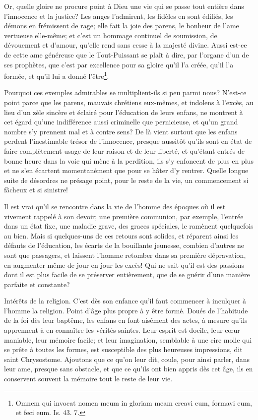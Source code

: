 \documentclass[instructions.tex]{subfiles}
\begin{document}
Or, quelle gloire ne procure point à Dieu une vie qui se passe tout entière dans l'innocence et la justice? Les anges l'admirent, les fidèles en sont édifiés, les démons en frémissent de rage; elle fait la joie des parens, le bonheur de l'ame vertueuse elle-même; et c'est un hommage continuel de soumission, de dévouement et d'amour, qu'elle rend sans cesse à la majesté divine. Aussi est-ce de cette ame généreuse que le Tout-Puissant se plaît à dire, par l'organe d'un de ses prophètes, que c'est par excellence pour sa gloire qu'il l'a créée, qu'il l'a formée, et qu'il lui a donné l'être\footnote{Omnem qui invocat nomen meum in gloriam meam creavi eum, formavi eum, et feci eum. Is. 43. 7.}.
 
Pourquoi ces exemples admirables se multiplient-ils si peu parmi nous? N'est-ce point parce que les parens, mauvais chrétiens eux-mêmes, et indolens à l'excès, au lieu d'un zèle sincère et éclairé pour l'éducation de leurs enfans, ne montrent à cet égard qu'une indifférence aussi criminelle que pernicieuse, et qu'un grand nombre s'y prennent mal et à contre sens? De là vient surtout que les enfans perdent l'inestimable trésor de l'innocence, presque aussitôt qu'ils sont en état de faire complètement usage de leur raison et de leur liberté, et qu'étant entrés de bonne heure dans la voie qui mène à la perdition, ils s'y enfoncent de plus en plus et ne s'en écartent momentanément que pour se hâter d'y rentrer. Quelle longue suite de désordres ne présage point, pour le reste de la vie, un commencement si fâcheux et si sinistre!
 
Il est vrai qu'il se rencontre dans la vie de l'homme des époques où il est vivement rappelé à son devoir; une première communion, par exemple, l'entrée dans un état fixe, une maladie grave, des graces spéciales, le ramènent quelquefois au bien. Mais si quelques-uns de ces retours sont solides, et réparent ainsi les défauts de l'éducation, les écarts de la bouillante jeunesse, combien d'autres ne sont que passagers, et laissent l'homme retomber dans sa première dépravation, en augmenter même de jour en jour les excès! Qui ne sait qu'il est des passions dont il est plus facile de se préserver entièrement, que de se guérir d'une manière parfaite et constante?
 
\secundo Intérêts de la religion. C'est dès son enfance qu'il faut commencer à inculquer à l'homme la religion. Point d'âge plus propre à y être formé. Doués de l'habitude de la foi dès leur baptême, les enfans en font aisément des actes, à mesure qu'ils apprennent à en connaître les vérités saintes. Leur esprit est docile, leur cœur maniable, leur mémoire facile; et leur imagination, semblable à une cire molle qui se prête à toutes les formes, est susceptible des plus heureuses impressions, dit saint Chrysostome. Ajoutons que ce qu'on leur dit, coule, pour ainsi parler, dans leur ame, presque sans obstacle, et que ce qu'ils ont bien appris dès cet âge, ils en conservent souvent la mémoire tout le reste de leur vie.
 
\end{document}
